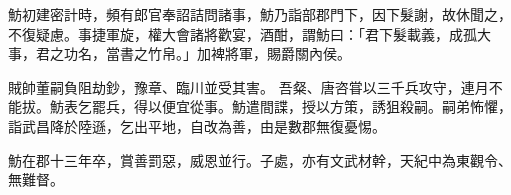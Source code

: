 \begin{pinyinscope}
 
 
 
 魴初建密計時，頻有郎官奉詔詰問諸事，魴乃詣部郡門下，因下髮謝，故休聞之，不復疑慮。事捷軍旋，權大會諸將歡宴，酒酣，謂魴曰：「君下髮載義，成孤大事，君之功名，當書之竹帛。」加裨將軍，賜爵關內侯。
 
 
 
 
賊帥董嗣負阻劫鈔，豫章、臨川並受其害。
 吾粲、唐咨甞以三千兵攻守，連月不能拔。魴表乞罷兵，得以便宜從事。魴遣間諜，授以方策，誘狙殺嗣。嗣弟怖懼，詣武昌降於陸遜，乞出平地，自改為善，由是數郡無復憂惕。
 
 
魴在郡十三年卒，賞善罰惡，威恩並行。子處，亦有文武材幹，天紀中為東觀令、無難督。
 
 
\end{pinyinscope}
